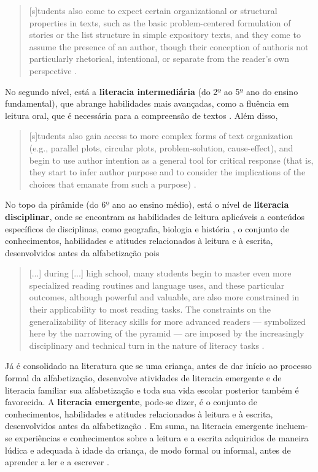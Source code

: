 \documentclass{textolivre}
\begin{document}
\begin{quote}
[s]tudents also come to expect certain organizational or structural properties in texts, such as the basic problem-centered formulation of stories or the list structure in simple expository texts, and they come to assume the presence of an author, though their conception of authoris not particularly rhetorical, intentional, or separate from the reader’s own perspective \cite[p. 44]{shanahan2008}.
\end{quote}

No segundo nível, está a \textbf{literacia intermediária} (do 2º ao 5º ano do ensino fundamental), que abrange habilidades mais avançadas, como a fluência em leitura oral, que é necessária para a compreensão de textos \cite[p. 21]{brasil2019}. Além disso,  

\begin{quote}
[s]tudents also gain access to more complex forms of text organization (e.g., parallel plots, circular plots, problem-solution, cause-effect), and begin to use author intention as a general tool for critical response (that is, they start to infer author purpose and to consider the implications of the choices that emanate from such a purpose) \cite[p. 45]{shanahan2008}.
\end{quote}

No topo da pirâmide (do 6º ano ao ensino médio), está o nível de \textbf{literacia disciplinar}, onde se encontram as habilidades de leitura aplicáveis a conteúdos específicos de disciplinas, como geografia, biologia e história \cite[p. 21]{brasil2019}, o conjunto de conhecimentos, habilidades e atitudes relacionados à leitura e à
escrita, desenvolvidos antes da alfabetização pois

\begin{quote}
[...] during [...] high school, many students begin to master even more specialized reading routines and language uses, and these particular outcomes, although powerful and valuable, are also more constrained in their applicability to most reading tasks. The constraints on the generalizability of literacy skills for more advanced readers — symbolized here by the narrowing of the pyramid — are imposed by the increasingly disciplinary and technical turn in the nature of literacy tasks \cite[p. 45]{shanahan2008}.
\end{quote}

Já é consolidado na literatura \cite[entre outros]{shanahan2008, wasik2004, senechal2008} que se uma criança, antes de dar início ao processo formal da alfabetização, desenvolve atividades de literacia emergente e de literacia familiar sua alfabetização e toda sua vida escolar posterior também é favorecida. A \textbf{literacia emergente}, pode-se dizer, é o conjunto de conhecimentos, habilidades e atitudes relacionados à leitura e à escrita, desenvolvidos antes da alfabetização \cite[p. 22]{brasil2019}. Em suma, na literacia emergente incluem-se experiências e conhecimentos sobre a leitura e a escrita adquiridos de maneira lúdica e adequada à idade da criança, de modo formal ou informal, antes de aprender a ler e a escrever \cite[p. 22]{brasil2019}.
\end{document}
